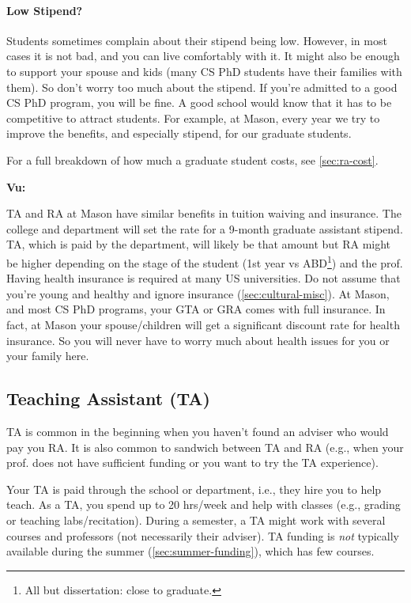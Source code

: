 \documentclass[oneside,11pt,dvipsnames]{book}
\newenvironment{commentbox}[1][]{
  \small
  \begin{mybox}
    {\small \textbf{#1}}
  }{
  \end{mybox}
}
\begin{document}
\paragraph{Low Stipend?} Students sometimes complain about their stipend being low. However, in most cases it is not bad, and you can live comfortably with it.  It might also be enough to support your spouse and kids (many CS PhD students have their families with them). So don't worry too much about the stipend.  If you're admitted to a good CS PhD program, you will be fine. A good school would know that it has to be competitive to attract students.  For example, at Mason, every year we try to improve the benefits, and especially stipend, for our graduate students.

For a full breakdown of how much a graduate student costs, see \autoref{sec:ra-cost}.


\begin{commentbox}[Vu:]
  TA and RA at Mason have similar benefits in tuition waiving and insurance.  The college and department will set the rate for a 9-month graduate assistant stipend.  TA, which is paid by the department, will likely be that amount but RA might be higher depending on the stage of the student (1st year vs ABD\footnote{All but dissertation: close to graduate.}) and the prof.
  \tcblower
  Having health insurance is required at many US universities.  Do not assume that you're young and healthy and ignore insurance (\autoref{sec:cultural-misc}).  At Mason, and most CS PhD programs, your GTA or GRA comes with full insurance. In fact, at Mason your spouse/children will get a significant discount rate for health insurance.  So you will never have to worry much about health issues for you or your family here.
\end{commentbox}


\subsection{Teaching Assistant (TA)}\label{sec:ta}

TA is common in the beginning when you haven't found an adviser who would pay you RA. It is also common to sandwich between TA and RA (e.g., when your prof. does not have sufficient funding or you want to try the TA experience).

Your TA is paid through the school or department, i.e., they hire you to help teach.
As a TA, you spend up to 20 hrs/week and help with classes (e.g., grading or teaching labs/recitation).
During a semester, a TA might work with several courses and professors (not necessarily their adviser).  TA funding is \emph{not} typically available during the summer (\autoref{sec:summer-funding}), which has few courses.
\end{document}
